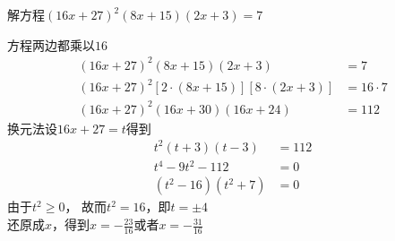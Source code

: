 \documentclass[windows,csize4,answers]{BHCexam}
\begin{document}
\begin{groups}
\begin{questions}[]
        \question[5]  解方程$(16x+27)^2(8x+15)(2x+3)=7$
        \begin{solution}{0.5cm}
            \methodonly 方程两边都乘以$16$
            \[
                \begin{aligned}
                    (16x+27)^2(8x+15)(2x+3)                 & =7         \\
                    (16x+27)^2[2\cdot(8x+15)][8\cdot(2x+3)] & =16\cdot 7 \\
                    (16x+27)^2(16x+30)(16x+24)              & =112
                \end{aligned}
            \]
            换元法设$16x+27=t$得到
            \[
                \begin{aligned}
                    t^2(t+3)(t-3)   & =112 \\
                    t^4-9t^2-112    & =0   \\
                    (t^2-16)(t^2+7) & =0
                \end{aligned}
            \]
            由于$t^2\ge 0$， 故而$t^2=16$，即$t=\pm 4$ \\
            还原成$x$，得到$x=-\frac{23}{16}$或者$x=-\frac{31}{16}$
        \end{solution}
        \vspace{3.5cm}


\end{questions}
\end{groups}
\end{document}
